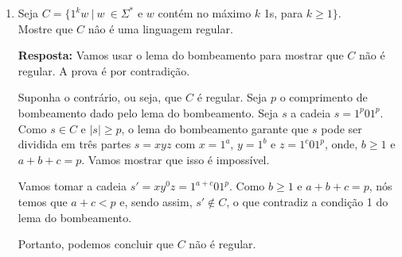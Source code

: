 \begin{enumerate}[label={\textbf{\alph*.}}]
    \item Seja $C = \{1^kw \ |\ w\ \in \Sigma^*$ e $w$ contém no máximo $k$ 1s, para $k \geq 1\}$.\\
    Mostre que $C$ nâo é uma linguagem regular.
    
    \textbf{Resposta:} Vamos usar o lema do bombeamento para mostrar que $C$ não é regular. A prova é por contradição.
    
    Suponha o contrário, ou seja, que $C$ é regular. Seja $p$ o comprimento de bombeamento dado pelo lema do bombeamento. Seja $s$ a cadeia $s = 1^p01^p$. Como $s \in C$ e $|s| \geq p$, o lema do bombeamento garante que $s$ pode ser dividida em três partes $s = xyz$ com $x = 1^a$, $y = 1^b$ e $z = 1^c01^p$, onde, $b \geq 1$ e $a + b + c = p$. Vamos mostrar que isso é impossível.
    
    Vamos tomar a cadeia $s' = xy^0z = 1^{a+c}01^p$. Como $b \geq 1$ e $a + b + c = p$, nós temos que $a + c < p$ e, sendo assim, $s' \notin C$, o que contradiz a condição 1 do lema do bombeamento.
    
    Portanto, podemos concluir que $C$ não é regular.
\end{enumerate}